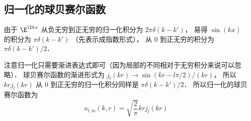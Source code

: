 \subsection{归一化的球贝赛尔函数}
由于 $\E^{\I kx}$ 从负无穷到正无穷的归一化积分为 $2\pi\delta(k-k')$， 易得 $\sin(kx)$ 的积分为 $\pi\delta(k-k')$ （先表示成指数形式）， 从 0 到正无穷的积分为 $\pi\delta(k-k')/2$．

注意归一化只需要渐进表达式即可（因为局部的不同相对于无穷积分来说可以忽略）． 球贝赛尔函数的渐进形式为 $j_l(kr) \to \sin(kr - l\pi/2)/(kr)$， 所以 $kr j_l(kr)$ 从 0 到正无穷的归一化积分同样是 $\pi\delta(k-k')/2$． 所以归一化的球贝赛尔函数为
\begin{equation}
u_{l,m}(k, r) = \sqrt{\frac{2}{\pi}} kr j_l(kr)
\end{equation}
